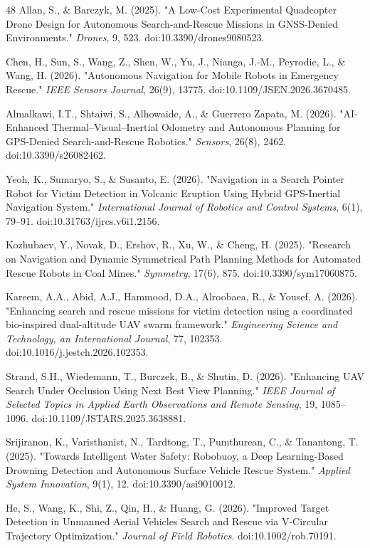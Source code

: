 \documentclass[journal]{IEEEtran}
\begin{document}
\begin{thebibliography}{48}
Allan, S., \& Barczyk, M. (2025). "A Low-Cost Experimental Quadcopter Drone Design for Autonomous Search-and-Rescue Missions in GNSS-Denied Environments." \textit{Drones}, 9, 523. doi:10.3390/drones9080523.

Chen, H., Sun, S., Wang, Z., Shen, W., Yu, J., Nianga, J.-M., Peyrodie, L., \& Wang, H. (2026). "Autonomous Navigation for Mobile Robots in Emergency Rescue." \textit{IEEE Sensors Journal}, 26(9), 13775. doi:10.1109/JSEN.2026.3670485.

Almalkawi, I.T., Shtaiwi, S., Alhowaide, A., \& Guerrero Zapata, M. (2026). "AI-Enhanced Thermal–Visual–Inertial Odometry and Autonomous Planning for GPS-Denied Search-and-Rescue Robotics." \textit{Sensors}, 26(8), 2462. doi:10.3390/s26082462.

Yeoh, K., Sumaryo, S., \& Susanto, E. (2026). "Navigation in a Search Pointer Robot for Victim Detection in Volcanic Eruption Using Hybrid GPS-Inertial Navigation System." \textit{International Journal of Robotics and Control Systems}, 6(1), 79–91. doi:10.31763/ijrcs.v6i1.2156.

Kozhubaev, Y., Novak, D., Ershov, R., Xu, W., \& Cheng, H. (2025). "Research on Navigation and Dynamic Symmetrical Path Planning Methods for Automated Rescue Robots in Coal Mines." \textit{Symmetry}, 17(6), 875. doi:10.3390/sym17060875.

Kareem, A.A., Abid, A.J., Hammood, D.A., Alroobaea, R., \& Yousef, A. (2026). "Enhancing search and rescue missions for victim detection using a coordinated bio-inspired dual-altitude UAV swarm framework." \textit{Engineering Science and Technology, an International Journal}, 77, 102353. doi:10.1016/j.jestch.2026.102353.

Strand, S.H., Wiedemann, T., Burczek, B., \& Shutin, D. (2026). "Enhancing UAV Search Under Occlusion Using Next Best View Planning." \textit{IEEE Journal of Selected Topics in Applied Earth Observations and Remote Sensing}, 19, 1085–1096. doi:10.1109/JSTARS.2025.3638881.

Srijiranon, K., Varisthanist, N., Tardtong, T., Pumthurean, C., \& Tanantong, T. (2025). "Towards Intelligent Water Safety: Robobuoy, a Deep Learning-Based Drowning Detection and Autonomous Surface Vehicle Rescue System." \textit{Applied System Innovation}, 9(1), 12. doi:10.3390/asi9010012.

He, S., Wang, K., Shi, Z., Qin, H., \& Huang, G. (2026). "Improved Target Detection in Unmanned Aerial Vehicles Search and Rescue via V-Circular Trajectory Optimization." \textit{Journal of Field Robotics}. doi:10.1002/rob.70191.


\end{thebibliography}
\end{document}
